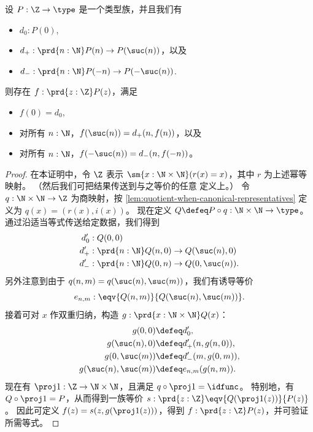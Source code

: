 \begin{lem}\label{thm:sign-induction}
  设 $P:\Z\to\type$ 是一个类型族，并且我们有
  \begin{itemize}
  \item $d_0: P(0)$,
  \item $d_+: \prd{n:\N} P(n) \to P(\suc(n))$，以及
  \item $d_- : \prd{n:\N} P(-n) \to P(-\suc(n))$.
  \end{itemize}
  则存在 $f:\prd{z:\Z} P(z)$，满足
  \begin{itemize}
    \item $f(0) = d_0$,
    \item 对所有 $n:\N$，$f(\suc(n)) = d_+(n,f(n))$，以及
    \item 对所有 $n:\N$，$f(-\suc(n)) = d_-(n,f(-n))$。
  \end{itemize}
\end{lem}
\begin{proof}
  在本证明中，令 $\Z$ 表示 $\sm{x:\N\times\N}(r(x)=x)$，其中 $r$ 为上述幂等映射。
  （然后我们可把结果传送到与之等价的任意 \Z 定义上。）
  令 $q:\N\times\N\to\Z$ 为商映射，按 \cref{lem:quotient-when-canonical-representatives} 定义为 $q(x) = (r(x),i(x))$。
  现在定义 $Q\defeq P\circ q:\N\times \N \to \type$。
  通过沿适当等式传送给定数据，我们得到
  \begin{align*}
    d'_0 &: Q(0,0)\\
    d'_+ &: \prd{n:\N} Q(n,0) \to Q(\suc(n),0)\\
    d'_- &: \prd{n:\N} Q(0,n) \to Q(0,\suc(n)).
  \end{align*}
  另外注意到由于 $q(n,m) = q(\suc(n),\suc(m))$，我们有诱导等价
  \[e_{n,m}:\eqv{Q(n,m)}{Q(\suc(n),\suc(m))}.\]
  接着可对 $x$ 作双重归纳，构造 $g:\prd{x:\N\times \N} Q(x)$：
  \begin{align*}
    g(0,0) &\defeq d'_0,\\
    g(\suc(n),0) &\defeq d'_+(n,g(n,0)),\\
    g(0,\suc(m)) &\defeq d'_-(m,g(0,m)),\\
    g(\suc(n),\suc(m)) &\defeq e_{n,m}(g(n,m)).
  \end{align*}
  现在有 $\proj1 : \Z \to \N\times\N$，且满足 $q\circ \proj1 = \idfunc$。
  特别地，有 $Q\circ \proj1 = P$，从而得到一族等价 $s:\prd{z:\Z} \eqv{Q(\proj1(z))}{P(z)}$。
  因此可定义 $f(z) = s(z,g(\proj1(z)))$，得到 $f:\prd{z:\Z} P(z)$，并可验证所需等式。
\end{proof}

